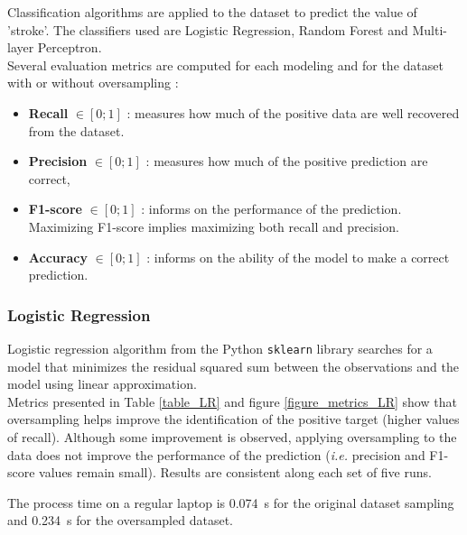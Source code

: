 Classification algorithms are applied to the dataset to predict the value of 'stroke'. The classifiers 
used are Logistic Regression, Random Forest and Multi-layer Perceptron.\\ 

Several evaluation metrics are computed for each modeling and for the dataset with or without 
oversampling :
\begin{itemize}
 \item \textbf{Recall} $\in [0;1]$ : measures how much of the positive data are well recovered from the dataset.
 \item \textbf{Precision} $\in [0;1]$ : measures how much of the positive prediction are correct, 
 \item \textbf{F1-score} $\in [0;1]$ : informs on the performance of the prediction. Maximizing F1-score implies maximizing both recall and precision.
 \item \textbf{Accuracy} $\in [0;1]$ : informs on the ability of the model to make a correct prediction.
\end{itemize} 

\subsubsection{Logistic Regression}
Logistic regression algorithm from the Python \texttt{sklearn} library searches for a model that 
minimizes the residual squared sum between the observations and the model using linear 
approximation.\\

Metrics presented in Table \ref{table_LR} and figure \ref{figure_metrics_LR} show that oversampling 
helps improve the identification of the positive target (higher values of recall). Although some 
improvement is observed, applying oversampling to the data does not improve the performance of the 
prediction (\textit{i.e.} precision and F1-score values remain small). Results are consistent along 
each set of five runs. 

The process time on a regular laptop is 0.074~s for the original dataset sampling and 0.234~s for the 
oversampled dataset.

